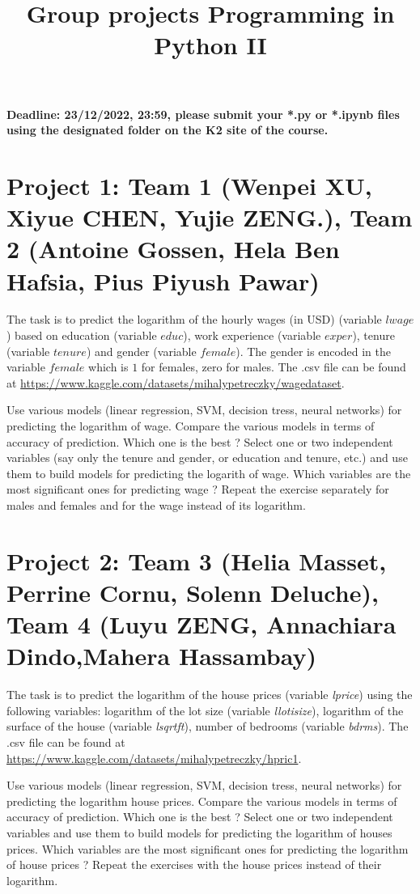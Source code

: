 \documentclass{article}
\title{Group projects Programming in Python II}
\author{}
\date{}
\begin{document}
\maketitle

\textbf{Deadline: 23/12/2022, 23:59,  please submit your *.py or *.ipynb files using the designated folder on the K2 site of the course.}



\section*{Project 1: Team 1 (Wenpei XU, Xiyue CHEN, Yujie ZENG.), Team 2 (Antoine Gossen, Hela Ben Hafsia, Pius Piyush Pawar) }
  The task is to  predict the logarithm of the hourly wages (in USD) (variable $lwage$) based on education (variable $educ$), work experience (variable $exper$), tenure (variable $tenure$) and gender (variable $female$). The gender is encoded in the variable $female$ which is $1$ for   females, zero for males. 
 The .csv file can be found at \url{https://www.kaggle.com/datasets/mihalypetreczky/wagedataset}. 

 Use various models (linear regression, SVM, decision tress, neural networks) for predicting the logarithm of  wage. Compare the various models in terms of accuracy of prediction. Which one is the best ? 
 Select one or two independent variables (say only the tenure and gender, or education and tenure, etc.)  and use them to build models for predicting the logarith of wage. Which variables are the most
 significant ones for predicting  wage ? Repeat the exercise separately for males and females and for the wage instead of its logarithm. 





\section*{Project 2:  Team 3 (Helia Masset, Perrine Cornu, Solenn Deluche), Team 4  (Luyu ZENG, Annachiara Dindo,Mahera Hassambay)}
  The task is to predict the logarithm of the house prices (variable \emph{lprice}) using the following variables:
  logarithm of the lot size (variable \emph{llotisize}), logarithm of the surface of the house (variable \emph{lsqrtft}), number of bedrooms (variable \emph{bdrms}). 	
   The .csv file can be found at \url{https://www.kaggle.com/datasets/mihalypetreczky/hpric1}.  

   Use various models (linear regression, SVM, decision tress, neural networks) for predicting the logarithm house prices. Compare the various models in terms of accuracy of prediction. Which one is the best ? 
 Select one or two independent variables  and use them to build models for predicting the logarithm of houses prices. Which variables are the most
 significant ones for predicting  the logarithm of house prices  ?  Repeat the exercises with the house prices instead of their logarithm. 
 
\end{document}
